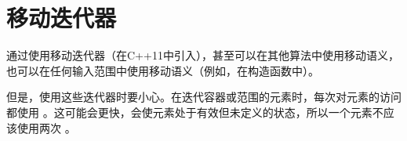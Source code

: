 \section{移动迭代器}
通过使用移动迭代器（在C++11中引入），甚至可以在其他算法中使用移动语义，也可以在任何输入范围中使用移动语义（例如，在构造函数中）。

但是，使用这些迭代器时要小心。在迭代容器或范围的元素时，每次对元素的访问都使用 。这可能会更快，会使元素处于有效但未定义的状态，所以一个元素不应该使用两次 。
































































